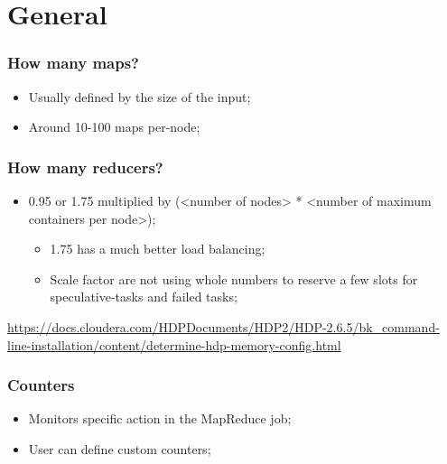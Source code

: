 \documentclass[aspectratio=169]{beamer}
\begin{document}
\section{General}

\begin{frame}
	\frametitle{How many maps?}

	\begin{itemize}
		\item Usually defined by the size of the input;
		\item Around 10-100 maps per-node;
	\end{itemize}
\end{frame}

\begin{frame}
	\frametitle{How many reducers?}

	\begin{itemize}
		\item 0.95 or 1.75 multiplied by (<number of nodes> * <number of maximum containers per node>);
		      \begin{itemize}
			      \item 1.75 has a much better load balancing;
			      \item Scale factor are not using whole numbers to reserve a few slots for speculative-tasks and failed tasks;
		      \end{itemize}
	\end{itemize}

	\begin{center}
		{\tiny \href{https://docs.cloudera.com/HDPDocuments/HDP2/HDP-2.6.5/bk_command-line-installation/content/determine-hdp-memory-config.html}{https://docs.cloudera.com/HDPDocuments/HDP2/HDP-2.6.5/bk\_command-line-installation/content/determine-hdp-memory-config.html}}
	\end{center}
\end{frame}

\begin{frame}
	\frametitle{Counters}

	\begin{itemize}
		\item Monitors specific action in the MapReduce job;
		\item User can define custom counters;
	\end{itemize}
\end{frame}
\end{document}
